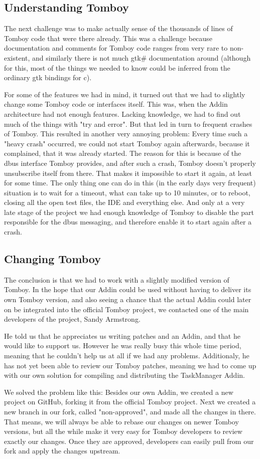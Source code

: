 \subsection{Understanding Tomboy}
\label{understanding_tomboy}
The next challenge was to make actually sense of the thousands of lines of Tomboy code that were there already. This was a challenge because documentation and comments for Tomboy code ranges from very rare to non-existent, and similarly there is not much gtk\# documentation around (although for this, most of the things we needed to know could be inferred from the ordinary gtk bindings for c).

For some of the features we had in mind, it turned out that we had to slightly change some Tomboy code or interfaces itself. This was, when the Addin architecture had not enough features. Lacking knowledge, we had to find out much of the things with "try and error". But that led in turn to frequent crashes of Tomboy. This resulted in another very annoying problem: Every time such a "heavy crash" occurred, we could not start Tomboy again afterwards, because it complained, that it was already started. The reason for this is because of the dbus interface Tomboy provides, and after such a crash, Tomboy doesn't properly unsubscribe itself from there. That makes it impossible to start it again, at least for some time. The only thing one can do in this (in the early days very frequent) situation is to wait for a timeout, what can take up to 10 minutes, or to reboot, closing all the open test files, the IDE and everything else. And only at a very late stage of the project we had enough knowledge of Tomboy to disable the part responsible for the dbus messaging, and therefore enable it to start again after a crash.


\subsection{Changing Tomboy}
\label{changing_tomboy}
The conclusion is that we had to work with a slightly modified version of Tomboy. In the hope that our Addin could be used without having to deliver its own Tomboy version, and also seeing a chance that the actual Addin could later on be integrated into the official Tomboy project, we contacted one of the main developers of the project, Sandy Armstrong.

He told us that he appreciates us writing patches and an Addin, and that he would like to support us. However he was really busy this whole time period, meaning that he couldn't help us at all if we had any problems. Additionaly, he has not yet been able to review our Tomboy patches, meaning we had to come up with our own solution for compiling and distributing the TaskManager Addin.

We solved the problem like this: Besides our own Addin, we created a new project on GitHub, forking it from the official Tomboy project. Next we created a new branch in our fork, called "non-approved", and made all the changes in there. That means, we will always be able to rebase our changes on newer Tomboy versions, but all the while make it very easy for Tomboy developers to review exactly our changes. Once they are approved, developers can easily pull from our fork and apply the changes upstream.